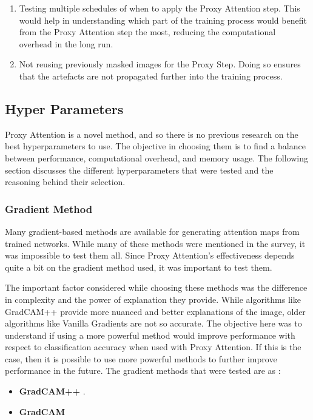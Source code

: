 \begin{enumerate}
    \item Testing multiple schedules of when to apply the Proxy Attention step. This would help in understanding which part of the training process would benefit from the Proxy Attention step the most, reducing the computational overhead in the long run.
    \item Not reusing previously masked images for the Proxy Step. Doing so ensures that the artefacts are not propagated further into the training process.
\end{enumerate}

\subsection{Hyper Parameters} \label{sec:hyperparameters}
Proxy Attention is a novel method, and so there is no previous research on the best hyperparameters to use. The objective in choosing them is to find a balance between performance, computational overhead, and memory usage. The following section discusses the different hyperparameters that were tested and the reasoning behind their selection.

\subsubsection{Gradient Method}
Many gradient-based methods are available for generating attention maps from trained networks. While many of these methods were mentioned in the survey, it was impossible to test them all. Since Proxy Attention's effectiveness depends quite a bit on the gradient method used, it was important to test them.

The important factor considered while choosing these methods was the difference in complexity and the power of explanation they provide. While algorithms like GradCAM++ \cite{chattopadhayGradCAMGeneralizedGradientBased2018} provide more nuanced and better explanations of the image, older algorithms like Vanilla Gradients \cite{zeilerVisualizingUnderstandingConvolutional2013} are not so accurate. The objective here was to understand if using a more powerful method would improve performance with respect to classification accuracy when used with Proxy Attention. If this is the case, then it is possible to use more powerful methods to further improve performance in the future.
The gradient methods that were tested are as :
\begin{itemize}
    \item \textbf{GradCAM++} \cite{chattopadhayGradCAMGeneralizedGradientBased2018}.
    \item \textbf{GradCAM} \cite{selvarajuGradCAMVisualExplanations}
\end{itemize}


